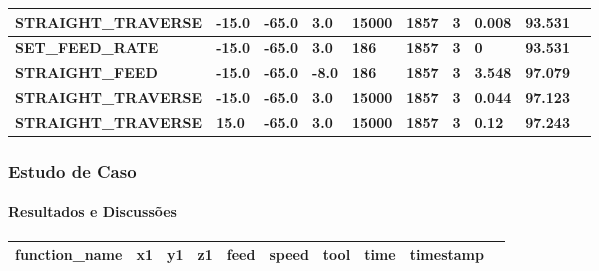 \documentclass[aspectratio=169]{beamer}
\begin{document}
{\begin{frame}[fragile]
\begin{tabular}{|l|l|l|l|l|l|l|l|l|l|}
    \tiny{\bfseries{STRAIGHT\_TRAVERSE}} & 
    \tiny{\bfseries{-15.0}} & 
    \tiny{\bfseries{-65.0}} & 
    \tiny{\bfseries{3.0}} & 
    \tiny{\bfseries{15000}} & 
    \tiny{\bfseries{1857}} & 
    \tiny{\bfseries{3}} & 
    \tiny{\bfseries{0.008}} & 
    \tiny{\bfseries{93.531}} \\
    \hline

    \tiny{\bfseries{SET\_FEED\_RATE}} & 
    \tiny{\bfseries{-15.0}} & 
    \tiny{\bfseries{-65.0}} & 
    \tiny{\bfseries{3.0}} & 
    \tiny{\bfseries{186}} & 
    \tiny{\bfseries{1857}} & 
    \tiny{\bfseries{3}} & 
    \tiny{\bfseries{0}} & 
    \tiny{\bfseries{93.531}} \\
    \hline

    \tiny{\bfseries{STRAIGHT\_FEED}} & 
    \tiny{\bfseries{-15.0}} & 
    \tiny{\bfseries{-65.0}} & 
    \tiny{\bfseries{-8.0}} & 
    \tiny{\bfseries{186}} & 
    \tiny{\bfseries{1857}} & 
    \tiny{\bfseries{3}} & 
    \tiny{\bfseries{3.548}} & 
    \tiny{\bfseries{97.079}} \\
    \hline    

    \tiny{\bfseries{STRAIGHT\_TRAVERSE}} & 
    \tiny{\bfseries{-15.0}} & 
    \tiny{\bfseries{-65.0}} & 
    \tiny{\bfseries{3.0}} & 
    \tiny{\bfseries{15000}} & 
    \tiny{\bfseries{1857}} & 
    \tiny{\bfseries{3}} & 
    \tiny{\bfseries{0.044}} & 
    \tiny{\bfseries{97.123}} \\
    \hline    

    \tiny{\bfseries{STRAIGHT\_TRAVERSE}} & 
    \tiny{\bfseries{15.0}} & 
    \tiny{\bfseries{-65.0}} & 
    \tiny{\bfseries{3.0}} & 
    \tiny{\bfseries{15000}} & 
    \tiny{\bfseries{1857}} & 
    \tiny{\bfseries{3}} & 
    \tiny{\bfseries{0.12}} & 
    \tiny{\bfseries{97.243}} \\
    \hline

  \end{tabular}

\end{frame}  


\begin{frame}[fragile]
  \frametitle{Estudo de Caso}
  \framesubtitle{Resultados e Discussões}

    \begin{tabular}{|l|l|l|l|l|l|l|l|l|l|}

      \hline

      \tiny{\bfseries{function\_name}} & 
      \tiny{\bfseries{x1}} & 
      \tiny{\bfseries{y1}} & 
      \tiny{\bfseries{z1}} & 
      \tiny{\bfseries{feed}} & 
      \tiny{\bfseries{speed}} & 
      \tiny{\bfseries{tool}} & 
      \tiny{\bfseries{time}} & 
      \tiny{\bfseries{timestamp}} \\
      \hline
    


\end{tabular}
\end{frame}}
\end{document}
